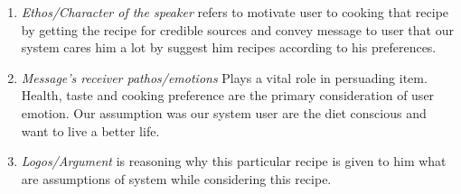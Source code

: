 \begin{enumerate}
	\item \textit{Ethos/Character of the speaker} refers to motivate user to cooking that recipe by getting the recipe for credible sources and convey message to user that our system cares him a lot by suggest him recipes according to his preferences.	
	
	\item \textit{Message’s receiver pathos/emotions} Plays a vital role in persuading item. Health, taste and cooking preference are the primary consideration of user emotion. Our assumption was our system user are the diet conscious and want to live a better life.
	
	\item \textit{Logos/Argument} is reasoning why this particular recipe is given to him what are assumptions of system while considering this recipe. 
\end{enumerate}

